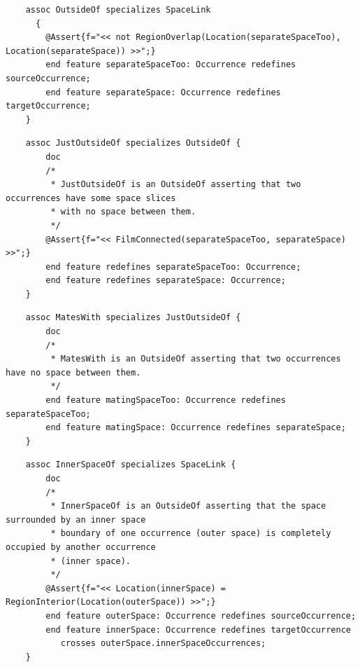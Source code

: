 \begin{lstlisting}
	assoc OutsideOf specializes SpaceLink 
	  {
		@Assert{f="<< not RegionOverlap(Location(separateSpaceToo), Location(separateSpace)) >>";}
		end feature separateSpaceToo: Occurrence redefines sourceOccurrence; 
		end feature separateSpace: Occurrence redefines targetOccurrence; 
	}
\end{lstlisting}

\begin{lstlisting}
	assoc JustOutsideOf specializes OutsideOf {
		doc
		/*
		 * JustOutsideOf is an OutsideOf asserting that two occurrences have some space slices 
		 * with no space between them.
		 */
		@Assert{f="<< FilmConnected(separateSpaceToo, separateSpace) >>";}
		end feature redefines separateSpaceToo: Occurrence;
		end feature redefines separateSpace: Occurrence;
	}
\end{lstlisting}

\begin{lstlisting}
	assoc MatesWith specializes JustOutsideOf {
		doc
		/*
		 * MatesWith is an OutsideOf asserting that two occurrences have no space between them.
		 */
		end feature matingSpaceToo: Occurrence redefines separateSpaceToo;
		end feature matingSpace: Occurrence redefines separateSpace;
	}
\end{lstlisting}

\begin{lstlisting}
	assoc InnerSpaceOf specializes SpaceLink {
		doc
		/*
		 * InnerSpaceOf is an OutsideOf asserting that the space surrounded by an inner space
		 * boundary of one occurrence (outer space) is completely occupied by another occurrence
		 * (inner space).
		 */
		@Assert{f="<< Location(innerSpace) = RegionInterior(Location(outerSpace)) >>";}
		end feature outerSpace: Occurrence redefines sourceOccurrence;
		end feature innerSpace: Occurrence redefines targetOccurrence 
		   crosses outerSpace.innerSpaceOccurrences;
	}
\end{lstlisting}



